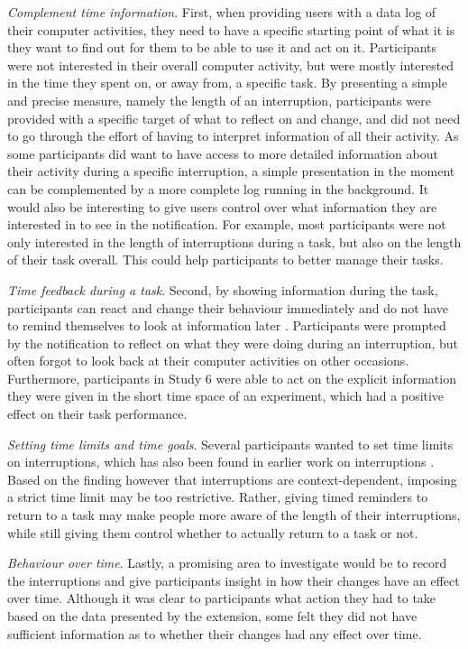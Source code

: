 \textit{Complement time information}. First, when providing users with a data log of their computer activities, they need to have a specific starting point of what it is they want to find out for them to be able to use it and act on it. Participants were not interested in their overall computer activity, but were mostly interested in the time they spent on, or away from, a specific task. By presenting a simple and precise measure, namely the length of an interruption, participants were provided with a specific target of what to reflect on and change, and did not need to go through the effort of having to interpret information of all their activity. As some participants did want to have access to more detailed information about their activity during a specific interruption, a simple presentation in the moment can be complemented by a more complete log running in the background. It would also be interesting to give users control over what information they are interested in to see in the notification. For example, most participants were not only interested in the length of interruptions during a task, but also on the length of their task overall. This could help participants to better manage their tasks.

\textit{Time feedback during a task}. Second, by showing information during the task, participants can react and change their behaviour immediately and do not have to remind themselves to look at information later \citep{Gould2016, Maior2018}. Participants were prompted by the notification to reflect on what they were doing during an interruption, but often forgot to look back at their computer activities on other occasions. Furthermore, participants in Study 6 were able to act on the explicit information they were given in the short time space of an experiment, which had a positive effect on their task performance.

\textit{Setting time limits and time goals}. Several participants wanted to set time limits on interruptions, which has also been found in earlier work on interruptions \citep{Mark2018, Whittaker2016}. Based on the finding however that interruptions are context-dependent, imposing a strict time limit may be too restrictive. Rather, giving timed reminders to return to a task may make people more aware of the length of their interruptions, while still giving them control whether to actually return to a task or not. 

\textit{Behaviour over time}. Lastly, a promising area to investigate would be to record the interruptions and give participants insight in how their changes have an effect over time. Although it was clear to participants what action they had to take based on the data presented by the extension, some felt they did not have sufficient information as to whether their changes had any effect over time.

